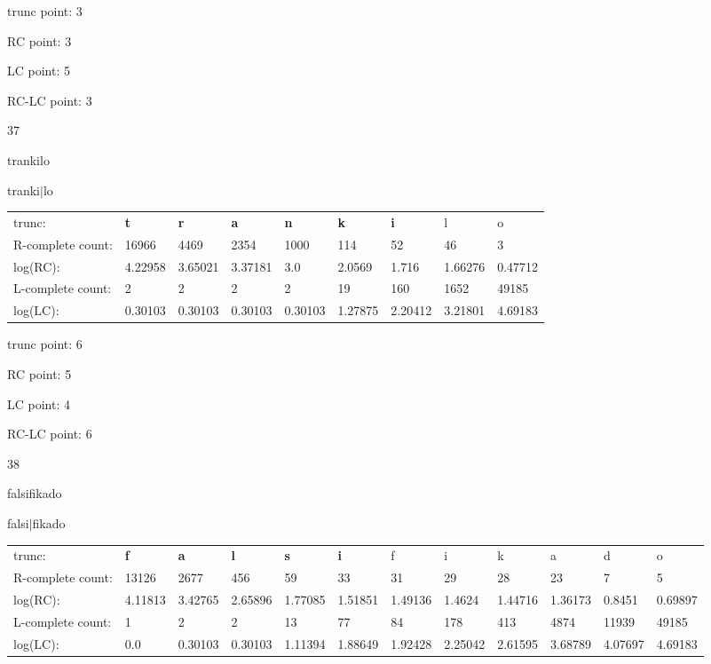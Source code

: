 \documentclass{article}
\begin{document}
trunc point: 3

RC point: 3

LC point: 5

RC-LC point: 3

\vspace{3em}



37

trankilo

tranki$|$lo

\vspace{1em}

\begin{tabular}{l|llllllll}

trunc: & {\color{red}\bf t} & {\color{red}\bf r} & {\color{red}\bf a} & {\color{red}\bf n} & {\color{red}\bf k} & {\color{red}\bf i} & l & o \\ 
R-complete count: & 16966 & 4469 & 2354 & 1000 & 114 & 52 & 46 & 3 \\ 
log(RC): & 4.22958 & 3.65021 & 3.37181 & 3.0 & 2.0569 & 1.716 & 1.66276 & 0.47712 \\ 
L-complete count: & 2 & 2 & 2 & 2 & 19 & 160 & 1652 & 49185 \\ 
log(LC): & 0.30103 & 0.30103 & 0.30103 & 0.30103 & 1.27875 & 2.20412 & 3.21801 & 4.69183 \\ 
\end{tabular}

trunc point: 6

RC point: 5

LC point: 4

RC-LC point: 6

\vspace{3em}



38

falsifikado

falsi$|$fikado

\vspace{1em}

\begin{tabular}{l|lllllllllll}

trunc: & {\color{red}\bf f} & {\color{red}\bf a} & {\color{red}\bf l} & {\color{red}\bf s} & {\color{red}\bf i} & f & i & k & a & d & o \\ 
R-complete count: & 13126 & 2677 & 456 & 59 & 33 & 31 & 29 & 28 & 23 & 7 & 5 \\ 
log(RC): & 4.11813 & 3.42765 & 2.65896 & 1.77085 & 1.51851 & 1.49136 & 1.4624 & 1.44716 & 1.36173 & 0.8451 & 0.69897 \\ 
L-complete count: & 1 & 2 & 2 & 13 & 77 & 84 & 178 & 413 & 4874 & 11939 & 49185 \\ 
log(LC): & 0.0 & 0.30103 & 0.30103 & 1.11394 & 1.88649 & 1.92428 & 2.25042 & 2.61595 & 3.68789 & 4.07697 & 4.69183 \\ 
\end{tabular}
\end{document}
